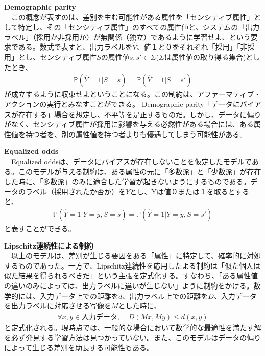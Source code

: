 \documentclass[b5j,twoside,twocolumn]{utarticle}
\begin{document}
\textbf{Demographic parity\cite{hardt2016equality}}\\
~~この概念が表すのは、差別を生む可能性がある属性を「センシティブ属性」として特定し、その「センシティブ属性」のすべての属性値と、システムの「出力ラベル」（採用か非採用か）が無関係（独立）であるように学習せよ、という要求である。数式で表すと、出力ラベルを$\hat{Y}$、値１と０をそれぞれ「採用」「非採用」とし、センシティブ属性$S$の属性値$s, s' \in \Sigma$($\Sigma$は属性値の取り得る集合)としたとき、
\begin{eqnarray}
\mathbb{P}(\hat{Y} = 1|S=s) =  \mathbb{P}(\hat{Y} = 1|S=s')
\end{eqnarray}
が成立するように収束せよということになる。この制約は、アファーマティブ・アクションの実行とみなすことができる\cite{mouzannar2018fair}。
Demographic parity「データにバイアスが存在する」場合を想定し、不平等を是正するものだ。しかし、データに偏りがなく、センシティブ属性が採用に影響を与える必然性がある場合には、ある属性値を持つ者を、別の属性値を持つ者よりも優遇してしまう可能性がある。

\textbf{Equalized odds\cite{hardt2016equality}}\\
~~Equalized oddsは、データにバイアスが存在しないことを仮定したモデルである。このモデルが与える制約は、ある属性の元に「多数派」と「少数派」が存在した時に、「多数派」のみに適合した学習が起きないようにするものである。データのラベル（採用されたか否か）を$Y$とし、Yは値$０または１$を取るとすると、
\begin{eqnarray}
\mathbb{P}(\hat{Y} = 1|Y=y, S=s) =  \mathbb{P}(\hat{Y} = 1|Y=y, S=s')
\end{eqnarray}
と表すことができる。


\textbf{Lipschitz連続性による制約\cite{dwork2011fairness}}\\
~~以上のモデルは、差別が生じる要因をある「属性」に特定して、確率的に対処するものであった。一方で、Lipschitz連続性を応用したよる制約は「似た個人は似た結果を得られるべきだ」という主張を定式化する。すなわち、「ある属性値の違いのみによっては、出力ラベルに違いが生じない」ように制約をかける。数学的には、入力データ上での距離を$d$、出力ラベル上での距離を$D$、入力データを出力ラベルに対応させる写像を$M$とした時に、\\
\begin{eqnarray}
\forall x, y \in 入力データ,~~~~~D(Mx, My) \leq d(x, y)
\end{eqnarray}
と定式化される。現時点では、一般的な場合において数学的な最適性を満たす解を必ず発見する学習方法は見つかっていない。また、このモデルはデータの偏りによって生じる差別を助長する可能性もある。
\end{document}
